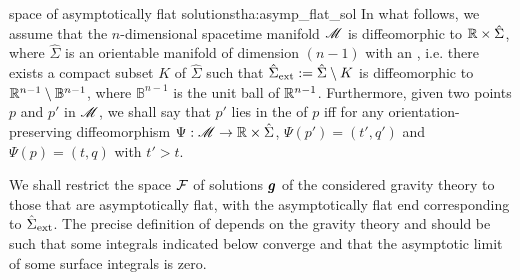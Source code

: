 \begin{tprop}{space of asymptotically flat solutions}{tha:asymp_flat_sol}
In what follows, we assume that the $n$-dimensional spacetime manifold $\mathscr{M}$ is diffeomorphic to $\mathbb{R}\times\hat{\Sigma}$,
where $\hat{\Sigma}$ is an orientable manifold of dimension $(n-1)$ with an
,
i.e. there exists a compact subset $K$ of $\hat{\Sigma}$ such that
$\hat{\Sigma}_{\rm ext} := \hat{\Sigma}\setminus K$
is diffeomorphic to $\mathbb{R}^{n-1} \setminus \mathbb{B}^{n-1}$, where $\mathbb{B}^{n-1}$ is the unit ball of
$\mathbb{R}^{n-1}$. Furthermore,
given two points $p$ and $p'$ in $\mathscr{M}$, we shall say that $p'$ lies in the
 of $p$ iff for any orientation-preserving diffeomorphism $\Psi: \mathscr{M} \to \mathbb{R}\times \hat{\Sigma}$,
$\Psi(p') = (t', q')$ and $\Psi(p) = (t, q)$ with $t'>t$.

We shall restrict the space $\mathcal{F}$ of solutions $\bm{g}$ of the considered gravity theory
to those that are asymptotically flat, with the asymptotically flat end corresponding to
$\hat{\Sigma}_{\rm ext}$. The precise definition of  depends on the gravity theory
and should be such that some integrals indicated below converge and that
the asymptotic limit of some surface integrals is zero.
\end{tprop}


